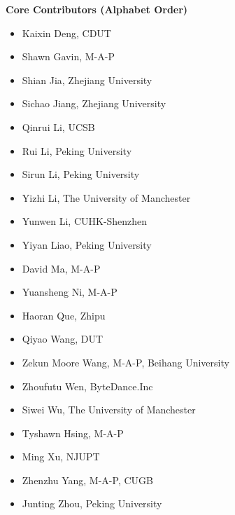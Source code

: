 \textbf{Core Contributors (Alphabet Order)}
\begin{multicols}{2}
    \begin{itemize}
        \item Kaixin Deng, CDUT
        \item Shawn Gavin, M-A-P
        \item Shian Jia, Zhejiang University
        \item Sichao Jiang, Zhejiang University
        \item Qinrui Li, UCSB
        \item Rui Li, Peking University
        \item Sirun Li, Peking University
        \item Yizhi Li, The University of Manchester
        \item Yunwen Li, CUHK-Shenzhen
        \item Yiyan Liao, Peking University
        \item David Ma, M-A-P
        \item Yuansheng Ni, M-A-P
        \item Haoran Que, Zhipu
        \item Qiyao Wang, DUT
        \item Zekun Moore Wang, M-A-P, Beihang University
        \item Zhoufutu Wen, ByteDance.Inc
        \item Siwei Wu, The University of Manchester
        \item Tyshawn Hsing, M-A-P
        \item Ming Xu, NJUPT
        \item Zhenzhu Yang, M-A-P, CUGB
        \item Junting Zhou, Peking University
    \end{itemize}
\end{multicols}


